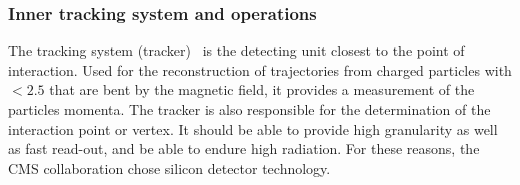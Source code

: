 \subsubsection{Inner tracking system and operations}
\label{sec:TRK}
The tracking system (tracker)~\cite{Chatrchyan:1704291} is the detecting unit closest to the point of interaction. Used for the reconstruction of  trajectories from charged particles with \abspsrap $<2.5$ that are bent by the magnetic field, it provides a measurement of the particles momenta. The tracker is also responsible for the determination of the interaction point or vertex. It should be able to provide high granularity as well as fast read-out, and be able to endure high radiation. For these reasons, the CMS collaboration chose silicon detector technology.

